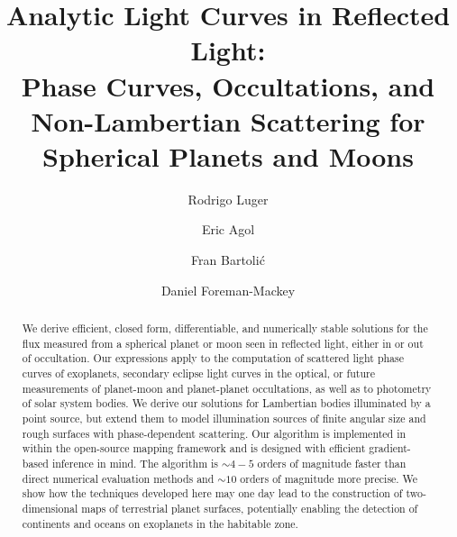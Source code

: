 \documentclass[modern]{aastex62}
\begin{document}
\title{%
    \textbf{
        Analytic Light Curves in Reflected Light:%
        \\%
        Phase Curves, Occultations, and Non-Lambertian Scattering for
        Spherical Planets and Moons
    }
}

\author[0000-0002-0296-3826]{Rodrigo Luger}
%
\author[0000-0002-0802-9145]{Eric Agol}
%
\author[0000-0001-8630-9794]{Fran Bartoli\'c}
%
\author[0000-0002-9328-5652]{Daniel Foreman-Mackey}


\begin{abstract}
    We derive efficient, closed form, differentiable, and numerically stable
    solutions for the flux measured from a spherical planet or moon seen in reflected
    light, either in or out of occultation.
    Our expressions apply to the computation of scattered
    light phase curves of exoplanets, secondary eclipse light curves in
    the optical, or future measurements of planet-moon and planet-planet
    occultations, as well as to photometry of solar system bodies.
    We derive our solutions for Lambertian bodies illuminated by a point
    source, but extend them to model illumination sources of finite
    angular size and rough surfaces with phase-dependent scattering.
    Our algorithm is implemented in \Python within the open-source
    \starry mapping framework and is designed with efficient gradient-based
    inference in mind.
    The algorithm is ${\sim}4-5$ orders of magnitude faster than direct
    numerical evaluation methods and ${\sim}10$ orders of magnitude more
    precise.
    We show how the techniques developed here may one day lead to the
    construction of two-dimensional maps of terrestrial planet surfaces,
    potentially enabling the detection of continents and oceans on
    exoplanets in the habitable zone.
    \href{https://github.com/rodluger/starrynight}{\color{linkcolor}\faGithub}
\end{abstract}
\end{document}

